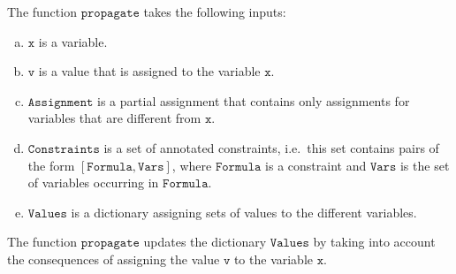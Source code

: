 The function $\mathtt{propagate}$ takes the following inputs:
\begin{enumerate}[(a)]
\item $\mathtt{x}$ is a variable.
\item $\mathtt{v}$ is a value that is assigned to the variable $\mathtt{x}$.
\item $\mathtt{Assignment}$ is a partial assignment that contains only assignments for variables that are
      different from $\mathtt{x}$.
\item $\mathtt{Constraints}$ is a set of annotated constraints, i.e.~this set contains pairs of the form 
      $\mathtt{[Formula, Vars]}$, where $\mathtt{Formula}$ is a constraint and $\mathtt{Vars}$ is the set of
      variables occurring in $\mathtt{Formula}$.
\item $\mathtt{Values}$ is a dictionary assigning sets of values to the different variables.
\end{enumerate}
The function $\mathtt{propagate}$ updates the dictionary $\mathtt{Values}$ by taking into account the
consequences of assigning the value $\mathtt{v}$ to the variable $\mathtt{x}$.

